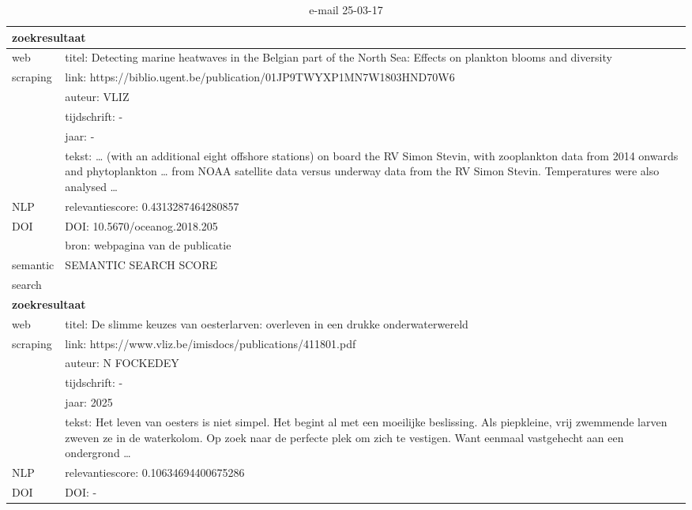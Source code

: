 \begin{table}[h!]
    \caption{e-mail 25-03-17}
    \centering
    \begin{tabularx}{\textwidth}{|p{4cm}|X|} 
        \hline
        \multicolumn{2}{|X|}{\textbf{zoekresultaat}} \\
        \hline
        web &titel: Detecting marine heatwaves in the Belgian part of the North Sea: Effects on plankton blooms and diversity\\
        scraping&link: https://biblio.ugent.be/publication/01JP9TWYXP1MN7W1803HND70W6\\
        &auteur: VLIZ\\
        &tijdschrift: -\\
        &jaar: -\\
        &tekst: … (with an additional eight offshore stations) on board the RV Simon Stevin, with zooplankton data from 2014 onwards and phytoplankton … from NOAA satellite data versus underway data from the RV Simon Stevin. Temperatures were also analysed …\\
        \hline
        NLP&relevantiescore: 0.4313287464280857\\
        \hline
        DOI&DOI: 10.5670/oceanog.2018.205\\
        &bron: webpagina van de publicatie\\
        \hline
        semantic&SEMANTIC SEARCH SCORE\\
        search&\\
        \hline
        \multicolumn{2}{|X|}{\textbf{zoekresultaat}} \\
        \hline
        web &titel: De slimme keuzes van oesterlarven: overleven in een drukke onderwaterwereld\\
        scraping&link: https://www.vliz.be/imisdocs/publications/411801.pdf\\
        &auteur: N FOCKEDEY\\
        &tijdschrift: -\\
        &jaar: 2025\\
        &tekst: Het leven van oesters is niet simpel. Het begint al met een moeilijke beslissing. Als piepkleine, vrij zwemmende larven zweven ze in de waterkolom. Op zoek naar de perfecte plek om zich te vestigen. Want eenmaal vastgehecht aan een ondergrond …\\
        \hline
        NLP&relevantiescore: 0.10634694400675286\\
        \hline
        DOI&DOI: -\\

\end{tabularx}
\end{table}
